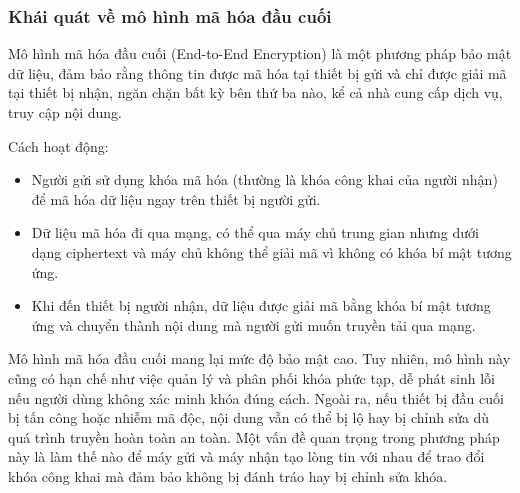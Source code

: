 \subsubsection{Khái quát về mô hình mã hóa đầu cuối}
\indent Mô hình mã hóa đầu cuối (End-to-End Encryption) là một phương pháp bảo mật dữ liệu, đảm bảo rằng thông tin được mã hóa tại thiết bị gửi và chỉ được giải mã tại thiết bị nhận, ngăn chặn bất kỳ bên thứ ba nào, kể cả nhà cung cấp dịch vụ, truy cập nội dung.

\indent Cách hoạt động:
\begin{itemize}
  \item Người gửi sử dụng khóa mã hóa (thường là khóa công khai của người nhận) để mã hóa dữ liệu ngay trên thiết bị người gửi.


  \item Dữ liệu mã hóa đi qua mạng, có thể qua máy chủ trung gian nhưng dưới dạng ciphertext và máy chủ không thể giải mã vì không có khóa bí mật tương ứng.

  \item Khi đến thiết bị người nhận, dữ liệu được giải mã bằng khóa bí mật tương ứng và chuyển thành nội dung mà người gửi muốn truyền tải qua mạng.
\end{itemize}

\indent Mô hình mã hóa đầu cuối mang lại mức độ bảo mật cao. Tuy nhiên, mô hình này cũng có hạn chế như việc quản lý và phân phối khóa phức tạp, dễ phát sinh lỗi nếu người dùng không xác minh khóa đúng cách. Ngoài ra, nếu thiết bị đầu cuối bị tấn công hoặc nhiễm mã độc, nội dung vẫn có thể bị lộ hay bị chỉnh sửa dù quá trình truyền hoàn toàn an toàn. Một vấn đề quan trọng trong phương pháp này là làm thế nào để máy gửi và máy nhận tạo lòng tin với nhau để trao đổi khóa công khai mà đảm bảo không bị đánh tráo hay bị chỉnh sửa khóa.
